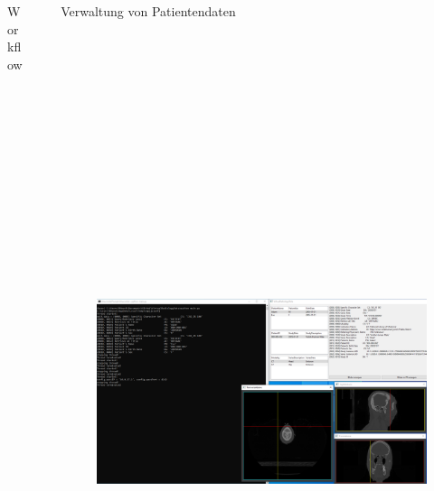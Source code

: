 \documentclass[final,hyperref={pdfpagelabels=false}]{beamer}
\begin{document}
\begin{frame}[t]
\begin{columns}[t]
\begin{column}{.465\textwidth}
\begin{block}{Workflow}
\end{block}

\end{column}


\begin{column}{.025\textwidth}\end{column} %

\begin{column}{0.465\textwidth}

\begin{block}{Verwaltung von Patientendaten}

    \begin{figure}
        \centering
        
        \includegraphics[height=21cm]{pythonApplication01}

\end{figure}
\end{block}
\end{column}
\end{columns}
\end{frame}
\end{document}
